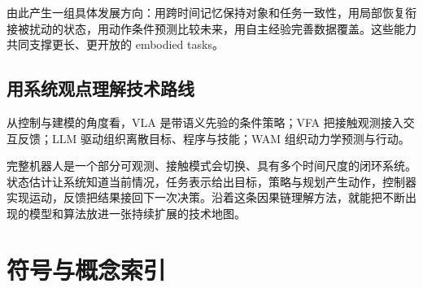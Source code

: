 \documentclass[UTF8,a4paper,11pt,oneside,openany,fontset=none]{ctexbook}
\begin{document}
由此产生一组具体发展方向：用跨时间记忆保持对象和任务一致性，用局部恢复衔接被扰动的状态，用动作条件预测比较未来，用自主经验完善数据覆盖。这些能力共同支撑更长、更开放的 embodied tasks。

\section{用系统观点理解技术路线}

从控制与建模的角度看，VLA 是带语义先验的条件策略；VFA 把接触观测接入交互反馈；LLM 驱动组织离散目标、程序与技能；WAM 组织动力学预测与行动。

完整机器人是一个部分可观测、接触模式会切换、具有多个时间尺度的闭环系统。状态估计让系统知道当前情况，任务表示给出目标，策略与规划产生动作，控制器实现运动，反馈把结果接回下一次决策。沿着这条因果链理解方法，就能把不断出现的模型和算法放进一张持续扩展的技术地图。

\appendix
\chapter{符号与概念索引}
\end{document}
